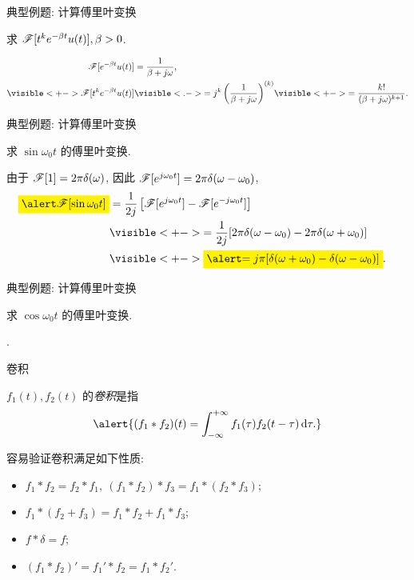 \begin{frame}{典型例题: 计算傅里叶变换}
\begin{example}
求 $\mathscr{F}[t^k e^{-\beta t}u(t)],\beta>0$.
\end{example}
\begin{solution}
\vspace{-\baselineskip}
\begin{align*}
\msf[e^{-\beta t}u(t)]&=\frac{1}{\beta+j\omega},\\
\visible<+->{\msf[t^ke^{-\beta t}u(t)]}&\visible<.->{=j^k\left(\frac1{\beta+j\omega}\right)^{(k)}}
  \visible<+->{=\frac{k!}{(\beta+j\omega)^{k+1}}.}
\end{align*}
\end{solution}
\end{frame}


\begin{frame}{典型例题: 计算傅里叶变换}
\begin{example}
求 $\sin{\omega_0 t}$ 的傅里叶变换.
\end{example}
\begin{solution}
由于 $\mathscr{F}[1]=2\pi\delta(\omega)$,
\onslide<+->
因此 $\mathscr{F}[e^{j\omega_0t}]=2\pi\delta(\omega-\omega_0)$,
\onslide<+->
\begin{align*}
\aboxeq{\msf[\sin{\omega_0 t}]}&=\frac1{2j}\left[\msf[e^{j\omega_0t}]-\msf[e^{-j\omega_0t}]\right]&\\
&\visible<+->{=\frac1{2j}[2\pi\delta(\omega-\omega_0)-2\pi\delta(\omega+\omega_0)]}&\\
&\visible<+->{\aboxeq{=j\pi[\delta(\omega+\omega_0)-\delta(\omega-\omega_0)]}.}
\end{align*}
\end{solution}
\end{frame}


\begin{frame}{典型例题: 计算傅里叶变换}
\begin{exercise}
求 $\cos{\omega_0 t}$ 的傅里叶变换.
\end{exercise}
\begin{answer}
.
\end{answer}
\end{frame}


\begin{frame}{卷积}
\begin{definition}
$f_1(t),f_2(t)$ 的\emph{卷积}是指
\[\alert{(f_1\ast f_2)(t)=\int_{-\infty}^{+\infty} f_1(\tau)f_2(t-\tau)\diff \tau.}\]
\end{definition}
\onslide<+->
容易验证卷积满足如下性质:
\begin{itemize}
\item $f_1\ast f_2=f_2\ast f_1,\ (f_1\ast f_2)\ast f_3=f_1\ast(f_2\ast f_3)$;
\item $f_1\ast(f_2+f_3)=f_1\ast f_2+f_1\ast f_3$;
\item $f\ast\delta=f$;
\item $(f_1\ast f_2)'=f_1'\ast f_2=f_1\ast f_2'$.
\end{itemize}
\end{frame}


